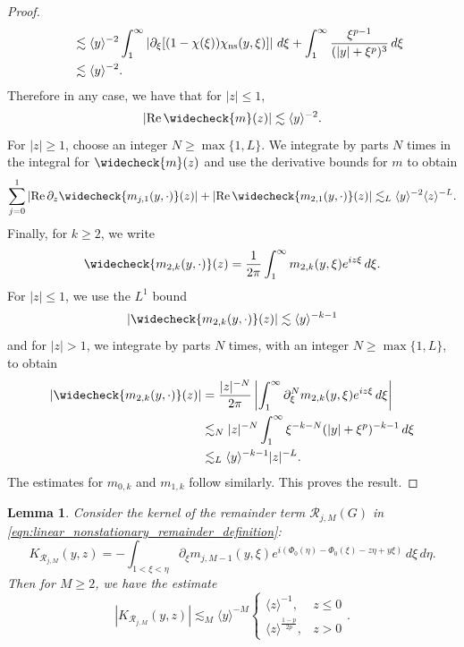 \documentclass[11pt]{amsart}
\newtheorem{lemma}[theorem]{Lemma}
\theoremstyle{definition}
\theoremstyle{remark}
\numberwithin{equation}{section}
\newcommand{\mc}[1]{\mathcal{#1}}
\newcommand{\ang}[1]{\langle #1 \rangle}
\begin{document}
\begin{proof}
\begin{align*}
        &\quad\lesssim\ang{y}^{-2}\int_1^\infty\left|\partial_\xi[(1-\chi(\xi))\chi_{\textup{ns}}(y,\xi)]\right|\,d\xi
        +\int_1^\infty\frac{\xi^{p-1}}{(|y|+\xi^p)^3}\,d\xi\\
        &\quad\lesssim\ang{y}^{-2}.
    \end{align*}
    Therefore in any case, we have that for $|z| \leq 1$,
    \[|\text{Re} \, \widecheck{m}(z)| \lesssim \ang{y}^{-2}.\]
    For $|z| \geq 1$, choose an integer $N\geq\max\{1,L\}$. We integrate by parts $N$ times in the integral for $\widecheck{m}(z)$ and use the derivative bounds for $m$ to obtain 
    \[
        \sum_{j=0}^1
        \left|\operatorname{Re}\partial_z\widecheck{m_{j,1}(y,\cdot)}(z)\right|
        +
        \left|\operatorname{Re}\widecheck{m_{2,1}(y,\cdot)}(z)\right|
        \lesssim_L
        \langle y\rangle^{-2}\langle z\rangle^{-L}.
    \]
    Finally, for $k \geq 2$, we write 
    \[\widecheck{m_{2,k}(y, \cdot)}(z) = \frac1{2\pi}\int_{1}^{\infty} m_{2,k}(y, \xi) e^{iz\xi} \, d\xi.\]
    For $|z| \leq 1$, we use the $L^1$ bound
    \[|\widecheck{m_{2,k}(y, \cdot)}(z)| \lesssim \ang{y}^{-k-1}\]
    and for $|z| > 1$, we integrate by parts $N$ times, with an integer $N\geq\max\{1,L\}$, to obtain
    \begin{align*}
        |\widecheck{m_{2,k}(y, \cdot)}(z)| & = \frac{|z|^{-N}}{2\pi}\left|\int_{1}^{\infty} \partial^N_\xi m_{2,k}(y, \xi) e^{iz\xi} \, d\xi\right| \\ 
        & \lesssim_N |z|^{-N}\int_{1}^{\infty}\xi^{-k - N}(|y| + \xi^p)^{-k-1} \, d\xi \\
        & \lesssim_L \ang{y}^{-k-1}|z|^{-L}.
    \end{align*}
    The estimates for $m_{0,k}$ and $m_{1,k}$ follow similarly. This proves the result.

\end{proof}


\begin{lemma}\label{lem:linear_nonstationary_remainder}
    Consider the kernel of the remainder term $\mc{R}_{j,M}(G)$ in \eqref{eqn:linear_nonstationary_remainder_definition}:
    \[K_{\mc{R}_{j,M}}(y, z) = -\int_{1<\xi<\eta}\partial_\xi m_{j,M-1}(y,\xi)
        e^{i(\Phi_0(\eta)-\Phi_0(\xi)-z\eta+y\xi)}\,d\xi\,d\eta.\]
    Then for $M \geq 2$, we have the estimate
    \[|K_{\mc{R}_{j,M}}(y, z)| \lesssim_M \ang{y}^{-M} \begin{cases}
        \ang{z}^{-1}, & z \leq 0 \\
        \ang{z}^{\frac{1-p}{2p}}, & z > 0
    \end{cases}.\]
\end{lemma}
\end{document}

